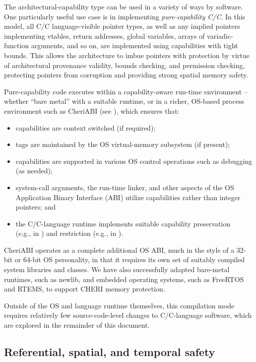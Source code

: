 \documentclass[12pt,twoside,openright,usletter]{article}
\newcommand{\ccode}[1]{{\small\ttfamily{#1}}}
\newcommand{\cfunc}[1]{{\ccode{#1()}}}
\newcommand*{\cpp}[1][]{C\textsmaller[2]{\nolinebreak[4]\hspace{-.05em}\raisebox{.45ex}{\textbf{++}}}}
\begin{document}
The architectural-capability type can be used in a variety of ways by
software.
One particularly useful use case is in implementing \textit{pure-capability
C/\cpp{}}.
In this model, all C/\cpp{} language-visible pointer types, as well as any
implied pointers implementing vtables, return addresses, global variables,
arrays of variadic-function arguments, and so on, are implemented using
capabilities with tight bounds.
This allows the architecture to imbue pointers with protection by virtue of
architectural provenance validity, bounds checking, and permission checking,
protecting pointers from corruption and providing strong spatial memory
safety.

Pure-capability code executes within a capability-aware run-time environment
-- whether ``bare metal'' with a suitable runtime, or in a richer, OS-based
process environment such as CheriABI (see ),
which ensures that:
\begin{itemize}
  \item capabilities are context switched (if required);
  \item tags are maintained by the OS virtual-memory subsystem (if present);
  \item capabilities are supported in various OS control operations such as
    debugging (as needed);
  \item system-call arguments, the
run-time linker, and other aspects of the OS Application Binary Interface
(ABI) utilize capabilities rather than integer pointers; and
  \item the C/\cpp{}-language runtime implements suitable capability preservation
    \\
    (e.g., in \cfunc{memcpy}) and restriction (e.g., in \cfunc{malloc}).
\end{itemize}
CheriABI operates as a complete additional OS ABI, much in the style of a
32-bit or 64-bit OS personality, in that it requires its own set of suitably
compiled system libraries and classes.
We have also successfully adapted bare-metal runtimes, such as newlib, and
embedded operating systems, such as FreeRTOS and RTEMS, to support CHERI
memory protection.

Outside of the OS and language runtime themselves, this compilation mode
requires relatively few source-code-level changes to C/\cpp{}-language software,
which are explored in the remainder of this document.

\subsection{Referential, spatial, and temporal safety}
\end{document}
